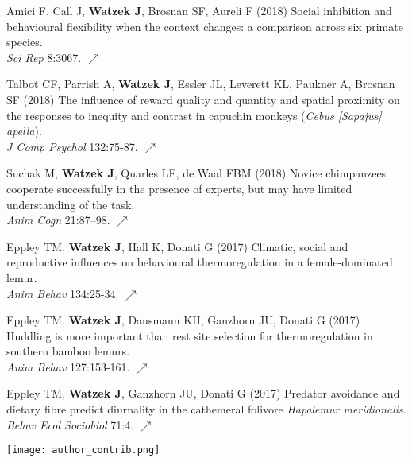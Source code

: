 \documentclass[]{friggeri-cv}
\begin{document}
\begin{enumerate}[label={[\,\arabic*\,]}]
  \item {Amici F, Call J, \textbf{Watzek J}, Brosnan SF, Aureli F (2018) Social inhibition and behavioural flexibility when the context changes: a comparison across six primate species. \\\emph{Sci Rep} 8:3067. \href{https://doi.org/10.1038/s41598-018-21496-6}{\small $\nearrow$}}
  \item {Talbot CF, Parrish A, \textbf{Watzek J}, Essler JL, Leverett KL, Paukner A, Brosnan SF (2018) The influence of reward quality and quantity and spatial proximity on the responses to inequity and contrast in capuchin monkeys (\emph{Cebus [Sapajus] apella}). \\\emph{J Comp Psychol} 132:75-87. \href{https://doi.org/10.1037/com0000088}{\small $\nearrow$}}
  \item {Suchak M, \textbf{Watzek J}, Quarles LF, de Waal FBM (2018) Novice chimpanzees cooperate successfully in the presence of experts, but may have limited understanding of the task. \\\emph{Anim Cogn} 21:87–98. \href{https://doi.org/10.1007/s10071-017-1142-2}{\small $\nearrow$}}
  \item {Eppley TM, \textbf{Watzek J}, Hall K, Donati G (2017) Climatic, social and reproductive influences on behavioural thermoregulation in a female-dominated lemur. \\\emph{Anim Behav} 134:25-34. \href{https://doi.org/10.1016/j.anbehav.2017.10.003}{\small $\nearrow$}}
  \item {Eppley TM, \textbf{Watzek J}, Dausmann KH, Ganzhorn JU, Donati G (2017) Huddling is more important than rest site selection for thermoregulation in southern bamboo lemurs. \\\emph{Anim Behav} 127:153-161. \href{https://doi.org/10.1016/j.anbehav.2017.03.019}{\small $\nearrow$}}
  \item {Eppley TM, \textbf{Watzek J}, Ganzhorn JU, Donati G (2017) Predator avoidance and dietary fibre predict diurnality in the cathemeral folivore \emph{Hapalemur meridionalis}. \\\emph{Behav Ecol Sociobiol} 71:4. \href{https://doi.org/10.1007/s00265-016-2247-3}{\small $\nearrow$}} 
\end{enumerate}

\texttt{[image: author\_contrib.png]}\\[.7cm] %

\end{document}
